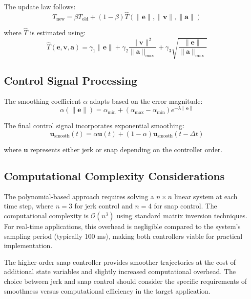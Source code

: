 \documentclass[12pt]{article}
\begin{document}
The update law follows:
\begin{equation}
T_\text{new} = \beta T_\text{old} + (1-\beta)\hat{T}(\|\mathbf{e}\|, \|\mathbf{v}\|, \|\mathbf{a}\|)
\end{equation}

where $\hat{T}$ is estimated using:
\begin{equation}
\hat{T}(\mathbf{e}, \mathbf{v}, \mathbf{a}) = \gamma_1\|\mathbf{e}\| + \gamma_2\frac{\|\mathbf{v}\|^2}{\|\mathbf{a}\|_\text{max}} + \gamma_3\sqrt{\frac{\|\mathbf{e}\|}{\|\mathbf{a}\|_\text{max}}}
\end{equation}

\subsection{Control Signal Processing}
The smoothing coefficient $\alpha$ adapts based on the error magnitude:
\begin{equation}
\alpha(\|\mathbf{e}\|) = \alpha_\text{min} + (\alpha_\text{max} - \alpha_\text{min})e^{-\lambda\|\mathbf{e}\|}
\end{equation}

The final control signal incorporates exponential smoothing:
\begin{equation}
\mathbf{u}_\text{smooth}(t) = \alpha\mathbf{u}(t) + (1-\alpha)\mathbf{u}_\text{smooth}(t-\Delta t)
\end{equation}

where $\mathbf{u}$ represents either jerk or snap depending on the controller order.

\subsection{Computational Complexity Considerations}
The polynomial-based approach requires solving a $n \times n$ linear system at each time step, where $n=3$ for jerk control and $n=4$ for snap control. The computational complexity is $\mathcal{O}(n^3)$ using standard matrix inversion techniques. For real-time applications, this overhead is negligible compared to the system's sampling period (typically 100 ms), making both controllers viable for practical implementation.

The higher-order snap controller provides smoother trajectories at the cost of additional state variables and slightly increased computational overhead. The choice between jerk and snap control should consider the specific requirements of smoothness versus computational efficiency in the target application.
\end{document}
